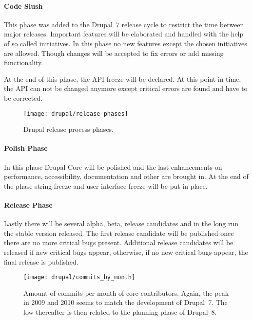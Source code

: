 \paragraph{Code Slush}

This phase was added to the Drupal~7 release cycle to restrict the time between
major releases. Important features will be elaborated and handled with the help
of so called initiatives. In this phase no new features except the chosen
initiatives are allowed. Though changes will be accepted to fix errors or add
missing functionality.

At the end of this phase, the \ac{API} freeze will be declared. At this point
in time, the \ac{API} can not be changed anymore except critical errors are
found and have to be corrected.

\begin{figure}[htbp]
  \centering
  \texttt{[image: drupal/release\_phases]}
  \caption[Drupal Release Process Phases]{Drupal release process phases.}
\end{figure}

\paragraph{Polish Phase}

In this phase Drupal Core will be polished and the last enhancements on
performance, accessibility, documentation and other are brought in. At the end
of the phase string freeze and user interface freeze will be put in place.

\paragraph{Release Phase}

Lastly there will be several alpha, beta, release candidates and in the long
run the stable version released. The first release candidate will be published
once there are no more critical bugs present. Additional release candidates
will be released if new critical bugs appear, otherwise, if no new critical
bugs appear, the final release is published.

\begin{figure}[htbp]
  \centering
  \texttt{[image: drupal/commits\_by\_month]}
  \caption[Commits by Month, Drupal]
  {Amount of commits per month of core contributors. Again, the peak in 2009
    and 2010 seems to match the development of Drupal~7. The low thereafter
    is then related to the planning phase of Drupal~8.}
\end{figure}

